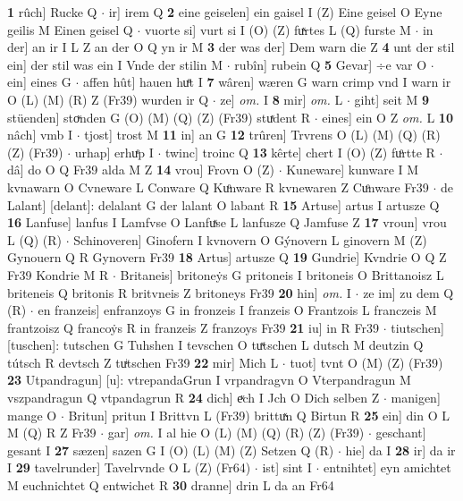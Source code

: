 \documentclass[8pt,a4paper,notitlepage]{article}
\begin{document}
\begin{table}[ht]
\begin{minipage}[t]{0.5\linewidth}
\textbf{1} rûch] Rucke Q  $\cdot$ ir] irem Q \textbf{2} eine geiselen] ein gaisel I (Z) Eine geisel O Eyne geilis M Einen geisel Q  $\cdot$ vuorte si] vurt si I (O) (Z) fuͯrtes L (Q) furste M  $\cdot$ in der] an ir I L Z an der O Q yn ir M \textbf{3} der was der] Dem warn die Z \textbf{4} unt der stil ein] der stil was ein I Vnde der stilin M  $\cdot$ rubîn] rubein Q \textbf{5} Gevar] ÷e var O  $\cdot$ ein] eines G  $\cdot$ affen hût] hauen huͤt I \textbf{7} wâren] wæren G warn crimp vnd I warn ir O (L) (M) (R) Z (Fr39) wurden ir Q  $\cdot$ ze] \textit{om.} I \textbf{8} mir] \textit{om.} L  $\cdot$ giht] seit M \textbf{9} stüenden] stoͮnden G (O) (M) (Q) (Z) (Fr39) stuͯdent R  $\cdot$ eines] ein O Z \textit{om.} L \textbf{10} nâch] vmb I  $\cdot$ tjost] trost M \textbf{11} in] an G \textbf{12} trûren] Trvrens O (L) (M) (Q) (R) (Z) (Fr39)  $\cdot$ urhap] erhuͤp I  $\cdot$ twinc] troinc Q \textbf{13} kêrte] chert I (O) (Z) fuͦrtte R  $\cdot$ dâ] do O Q Fr39 alda M Z \textbf{14} vrou] Frovn O (Z)  $\cdot$ Kuneware] kunware I M kvnawarn O Cvneware L Conware Q Kuͦnware R kvnewaren Z Cuͦnware Fr39  $\cdot$ de Lalant] [delant]: delalant G der lalant O labant R \textbf{15} Artuse] artus I artusze Q \textbf{16} Lanfuse] lanfus I Lamfvse O Lanfuͯse L lanfusze Q Jamfuse Z \textbf{17} vroun] vrou L (Q) (R)  $\cdot$ Schinoveren] Ginofern I kvnovern O Gýnovern L ginovern M (Z) Gynouern Q R Gynovern Fr39 \textbf{18} Artus] artusze Q \textbf{19} Gundrie] Kvndrie O Q Z Fr39 Kondrie M R  $\cdot$ Britaneis] britoneẏs G pritoneis I britoneis O Brittanoisz L briteneis Q britonis R britvneis Z britoneys Fr39 \textbf{20} hin] \textit{om.} I  $\cdot$ ze im] zu dem Q (R)  $\cdot$ en franzeis] enfranzoys G in fronzeis I franzeis O Frantzois L franczeis M frantzoisz Q francoẏs R in franzeis Z franzoys Fr39 \textbf{21} iu] in R Fr39  $\cdot$ tiutschen] [tuschen]: tutschen G Tuhshen I tevschen O tuͯtschen L dutsch M deutzin Q tútsch R devtsch Z tuͥtschen Fr39 \textbf{22} mir] Mich L  $\cdot$ tuot] tvnt O (M) (Z) (Fr39) \textbf{23} Utpandragun] [u]: vtrepandaGrun I vrpandragvn O Vterpandragun M vszpandragun Q vtpandagrun R \textbf{24} dich] eͮch I Jch O Dich selben Z  $\cdot$ manigen] mange O  $\cdot$ Britun] pritun I Brittvn L (Fr39) brittuͯn Q Birtun R \textbf{25} ein] din O L M (Q) R Z Fr39  $\cdot$ gar] \textit{om.} I al hie O (L) (M) (Q) (R) (Z) (Fr39)  $\cdot$ geschant] gesant I \textbf{27} sæzen] sazen G I (O) (L) (M) (Z) Setzen Q (R)  $\cdot$ hie] da I \textbf{28} ir] da ir I \textbf{29} tavelrunder] Tavelrvnde O L (Z) (Fr64)  $\cdot$ ist] sint I  $\cdot$ entnihtet] eyn amichtet M euchnichtet Q entwichet R \textbf{30} dranne] drin L da an Fr64 \newline

\end{minipage}
\end{table}
\end{document}
